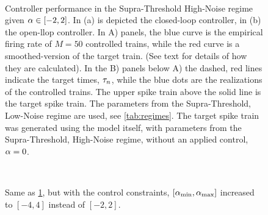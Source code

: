 \begin{figure}[htp]
\begin{center}
  \\
\caption[Controller simulations for Supra-Threshold High-Noise
regime]{Controller performance in the Supra-Threshold High-Noise regime given $\alpha \in [-2,2]$. 
  In (a) is depicted the closed-loop controller, in (b) the open-llop
  controller.
  In A) panels, the blue curve is the empirical firing
  rate of $M=50$ controlled trains, while the red curve is a
  smoothed-version of the target train. 
  (See text for details of how they are calculated). 
  In the B) panels below A) the dashed, red lines indicate the target times,
  ${\tau}_n$, while the blue dots are the realizations of the controlled trains.  
  The upper spike train above the solid line is the target spike train.
  The parameters from the Supra-Threshold, Low-Noise regime are used, see \cref{tab:regimes}. 
  The target spike train was generated
  using the model itself, with parameters from the Supra-Threshold, High-Noise regime, without an applied
  control, $\alpha=0$.
}
  \label{fig:targettrain_highnoise}     
\end{center}
\end{figure}

\begin{figure}[htp]
\begin{center}
\\
 \caption[Controller simulations for Supra-Threshold High-Noise regime with
 relaxed control-constraints] {Same as \cref{fig:targettrain_highnoise}, but with the control
  constraints, $[{ \alpha_{\textrm{min}} }, { \alpha_{\textrm{max}} }]$ increased to $[-4,4]$ instead of $[-2,2]$.}
  \label{fig:targettrain_cl_highnoise_aplus}     
\end{center}
\end{figure} 

